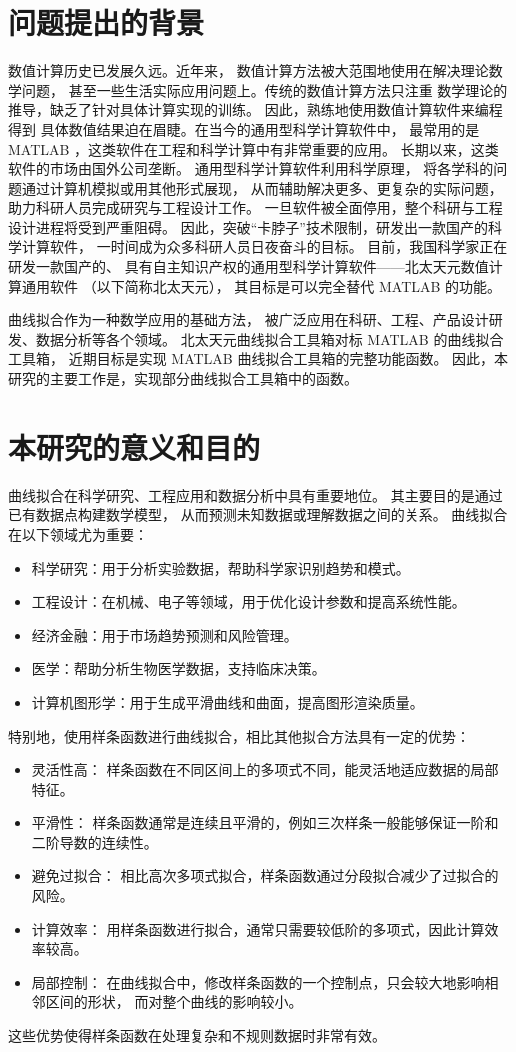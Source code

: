 \section{问题提出的背景}
数值计算历史已发展久远。近年来，
数值计算方法被大范围地使用在解决理论数学问题，
甚至一些生活实际应用问题上。传统的数值计算方法只注重
数学理论的推导，缺乏了针对具体计算实现的训练。
因此，熟练地使用数值计算软件来编程得到
具体数值结果迫在眉睫。在当今的通用型科学计算软件中，
最常用的是 MATLAB ，这类软件在工程和科学计算中有非常重要的应用。
长期以来，这类软件的市场由国外公司垄断。
通用型科学计算软件利用科学原理，
将各学科的问题通过计算机模拟或用其他形式展现，
从而辅助解决更多、更复杂的实际问题，
助力科研人员完成研究与工程设计工作。
一旦软件被全面停用，整个科研与工程设计进程将受到严重阻碍。
因此，突破“卡脖子”技术限制，研发出一款国产的科学计算软件，
一时间成为众多科研人员日夜奋斗的目标。
目前，我国科学家正在研发一款国产的、
具有自主知识产权的通用型科学计算软件——北太天元数值计算通用软件
（以下简称北太天元），
其目标是可以完全替代 MATLAB 的功能。\cite{baltamChinese}

曲线拟合作为一种数学应用的基础方法，
被广泛应用在科研、工程、产品设计研发、数据分析等各个领域。
北太天元曲线拟合工具箱对标 MATLAB 的曲线拟合工具箱，
近期目标是实现 MATLAB 曲线拟合工具箱的完整功能函数。
因此，本研究的主要工作是，实现部分曲线拟合工具箱中的函数。

\section{本研究的意义和目的}

\par 曲线拟合在科学研究、工程应用和数据分析中具有重要地位。
其主要目的是通过已有数据点构建数学模型，
从而预测未知数据或理解数据之间的关系。
曲线拟合在以下领域尤为重要：
\begin{itemize}
\item 科学研究：用于分析实验数据，帮助科学家识别趋势和模式。
\item 工程设计：在机械、电子等领域，用于优化设计参数和提高系统性能。
\item 经济金融：用于市场趋势预测和风险管理。
\item 医学：帮助分析生物医学数据，支持临床决策。
\item 计算机图形学：用于生成平滑曲线和曲面，提高图形渲染质量。
\end{itemize}
特别地，使用样条函数进行曲线拟合，相比其他拟合方法具有一定的优势：
\begin{itemize}
\item 灵活性高：
  样条函数在不同区间上的多项式不同，能灵活地适应数据的局部特征。
\item 平滑性：
  样条函数通常是连续且平滑的，例如三次样条一般能够保证一阶和二阶导数的连续性。
\item 避免过拟合：
  相比高次多项式拟合，样条函数通过分段拟合减少了过拟合的风险。
\item 计算效率：
  用样条函数进行拟合，通常只需要较低阶的多项式，因此计算效率较高。
\item 局部控制：
  在曲线拟合中，修改样条函数的一个控制点，只会较大地影响相邻区间的形状，
  而对整个曲线的影响较小。
\end{itemize}
这些优势使得样条函数在处理复杂和不规则数据时非常有效。
